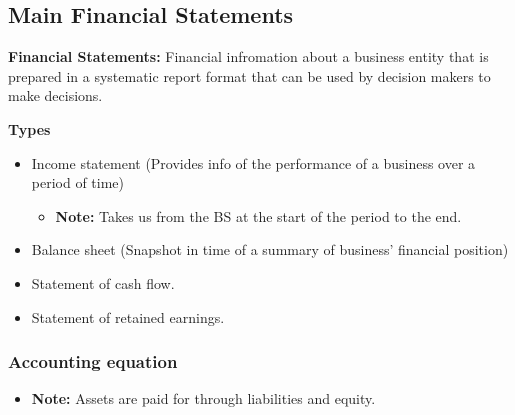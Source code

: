 \subsection{Main Financial Statements}
\begin{definition}
    \textbf{Financial Statements:} Financial infromation about a business entity that is prepared in a systematic report format that can be used by decision makers to make decisions. 
    \vspace{1em}

    \textbf{Types}
    \begin{itemize}
        \item Income statement (Provides info of the performance of a business over a period of time)
        \begin{itemize}
            \item \textbf{Note:} Takes us from the BS at the start of the period to the end. 
        \end{itemize}
        \item Balance sheet (Snapshot in time of a summary of business' financial position)
        \item Statement of cash flow.
        \item Statement of retained earnings.
    \end{itemize}
\end{definition}

\subsubsection{Accounting equation}
\begin{definition}
    \begin{itemize}
        \item \textbf{Note:} Assets are paid for through liabilities and equity.
    \end{itemize}
\end{definition}

